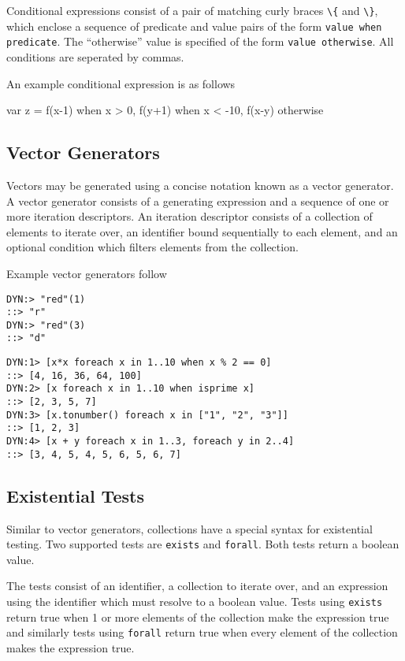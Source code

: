 \documentclass[11pt]{article}
\newcommand{\literal}[1]{\lstinline[style=DSL,identifierstyle=\itshape]!#1!}
\newcommand{\keyword}[1]{\literal{#1}}
\begin{document}
Conditional expressions consist of a pair of matching curly braces
\keyword{\{} and \keyword{\}}, which enclose a sequence of predicate and value pairs
of the form \literal{value when predicate}.  The ``otherwise'' value
is specified of the form \literal{value otherwise}.  All conditions are
seperated by commas.

An example conditional expression is as follows

\begin{dsl}
var z = {f(x-1) when x > 0,
         f(y+1) when x < -10,
         f(x-y) otherwise}
\end{dsl}

\subsection {Vector Generators}

Vectors may be generated using a concise notation known as a vector
generator.  A vector generator consists of a generating expression and
a sequence of one or more iteration descriptors.  An iteration
descriptor consists of a collection of elements to iterate over, an
identifier bound sequentially to each element, and an optional
condition which filters elements from the collection.

Example vector generators follow

\begin{lstlisting}
DYN:> "red"(1)
::> "r"
DYN:> "red"(3)
::> "d"
\end{lstlisting}

\begin{lstlisting}
DYN:1> [x*x foreach x in 1..10 when x % 2 == 0]
::> [4, 16, 36, 64, 100]
DYN:2> [x foreach x in 1..10 when isprime x]
::> [2, 3, 5, 7]
DYN:3> [x.tonumber() foreach x in ["1", "2", "3"]]
::> [1, 2, 3]
DYN:4> [x + y foreach x in 1..3, foreach y in 2..4]
::> [3, 4, 5, 4, 5, 6, 5, 6, 7]
\end{lstlisting}

\subsection {Existential Tests}

Similar to vector generators, collections have a special syntax for
existential testing.  Two supported tests are \keyword{exists} and
\keyword{forall}.  Both tests return a boolean value.

The tests consist of an identifier, a collection to iterate over, and
an expression using the identifier which must resolve to a boolean
value.  Tests using \keyword{exists} return true when 1 or more
elements of the collection make the expression true and similarly
tests using \keyword{forall} return true when every element of the
collection makes the expression true.
\end{document}
